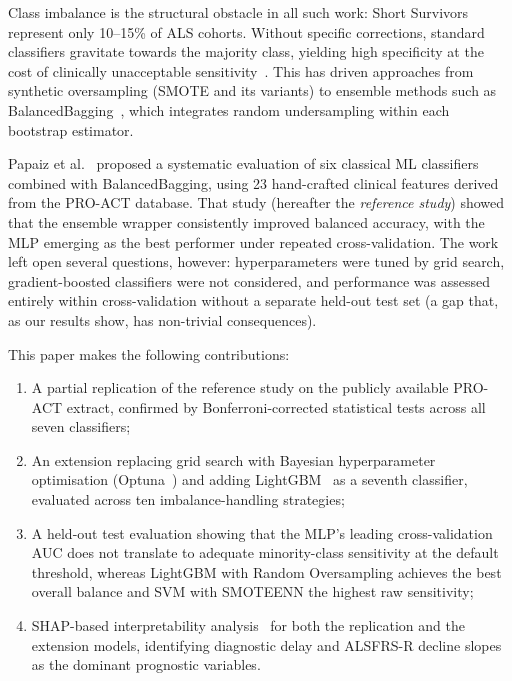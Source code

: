 \documentclass[preprint,12pt]{elsarticle}
\begin{document}
Class imbalance is the structural obstacle in all such work: Short Survivors
represent only 10--15\% of ALS cohorts. Without specific corrections, standard classifiers
gravitate towards the majority class, yielding high specificity at the cost of
clinically unacceptable sensitivity~\cite{chawla2002smote}. This has driven
approaches from synthetic oversampling (SMOTE and its variants) to ensemble
methods such as BalancedBagging~\cite{lemaitre2017}, which integrates random
undersampling within each bootstrap estimator.

Papaiz et al.~\cite{Papaiz2024} proposed a systematic evaluation of six
classical ML classifiers combined with BalancedBagging, using 23 hand-crafted
clinical features derived from the PRO-ACT database. That study (hereafter the
\emph{reference study}) showed that the ensemble wrapper consistently improved
balanced accuracy, with the MLP emerging as the best performer under repeated
cross-validation. The work left open several questions, however: hyperparameters
were tuned by grid search, gradient-boosted classifiers were not considered, and
performance was assessed entirely within cross-validation without a separate
held-out test set (a gap that, as our results show, has non-trivial consequences).

This paper makes the following contributions:
\begin{enumerate}
  \item A partial replication of the reference study on the publicly available
    PRO-ACT extract, confirmed by Bonferroni-corrected statistical tests across
    all seven classifiers;
  \item An extension replacing grid search with Bayesian hyperparameter
    optimisation (Optuna~\cite{optuna2019}) and adding LightGBM~\cite{ke2017lightgbm}
    as a seventh classifier, evaluated across ten imbalance-handling strategies;
  \item A held-out test evaluation showing that the MLP's leading cross-validation
    AUC does not translate to adequate minority-class sensitivity at the default
    threshold, whereas LightGBM with Random Oversampling achieves the best overall
    balance and SVM with SMOTEENN the highest raw sensitivity;
  \item SHAP-based interpretability analysis~\cite{lundberg2017shap,lundberg2020treeshap}
    for both the replication and the extension models, identifying diagnostic delay
    and ALSFRS-R decline slopes as the dominant prognostic variables.
\end{enumerate}
\end{document}
